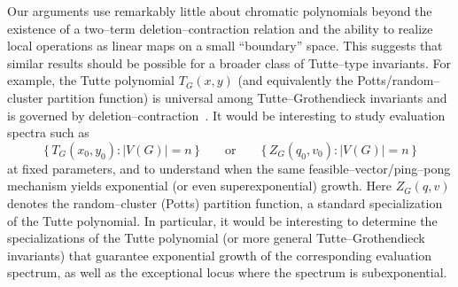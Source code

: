 \documentclass[A4paper,reqno,oneside,12pt]{amsart}
\theoremstyle{plain}
\theoremstyle{definition}
\begin{document}
Our arguments use remarkably little about chromatic polynomials beyond the existence of a two--term deletion--contraction relation
and the ability to realize local operations as linear maps on a small ``boundary'' space.
This suggests that similar results should be possible for a broader class of Tutte--type invariants.
For example, the Tutte polynomial $T_G(x,y)$ (and equivalently the Potts/random--cluster partition function) is universal among
Tutte--Grothendieck invariants and is governed by deletion--contraction~\cite{Tutte1954}.
It would be interesting to study evaluation spectra such as
\[
\{\,T_G(x_0,y_0):|V(G)|=n\,\}
\qquad\text{or}\qquad
\{\,Z_G(q_0,v_0):|V(G)|=n\,\}
\]
at fixed parameters, and to understand when the same feasible--vector/ping--pong mechanism yields exponential (or even superexponential) growth. Here $Z_G(q,v)$ denotes the random–cluster (Potts) partition function, a standard specialization of the Tutte polynomial. In particular, it would be interesting to determine the specializations of the Tutte polynomial (or more general Tutte--Grothendieck invariants) that guarantee
exponential growth of the corresponding evaluation spectrum, as well as the exceptional locus where the spectrum is subexponential.
\end{document}
